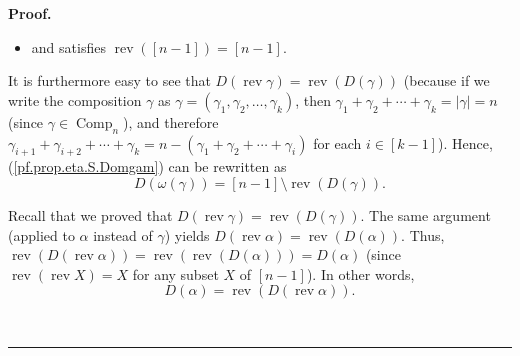 \documentclass[numbers=enddot,12pt,final,onecolumn,notitlepage]{scrartcl}%
\theoremstyle{definition}
\newenvironment{proof}[1][Proof]{\noindent\textbf{#1.} }{\ \rule{0.5em}{0.5em}}
\newenvironment{noncompile}{}{}
\begin{document}
\begin{proof}
\begin{noncompile}
\begin{itemize}
\item and satisfies $\operatorname*{rev}\left(  \left[  n-1\right]  \right)
=\left[  n-1\right]  $.
\end{itemize}

It is furthermore easy to see that $D\left(  \operatorname*{rev}\gamma\right)
=\operatorname*{rev}\left(  D\left(  \gamma\right)  \right)  $ (because if we
write the composition $\gamma$ as $\gamma=\left(  \gamma_{1},\gamma_{2}%
,\ldots,\gamma_{k}\right)  $, then $\gamma_{1}+\gamma_{2}+\cdots+\gamma
_{k}=\left\vert \gamma\right\vert =n$ (since $\gamma\in\operatorname*{Comp}%
\nolimits_{n}$), and therefore $\gamma_{i+1}+\gamma_{i+2}+\cdots+\gamma
_{k}=n-\left(  \gamma_{1}+\gamma_{2}+\cdots+\gamma_{i}\right)  $ for each
$i\in\left[  k-1\right]  $). Hence, (\ref{pf.prop.eta.S.Domgam}) can be
rewritten as%
\begin{equation}
D\left(  \omega\left(  \gamma\right)  \right)  =\left[  n-1\right]
\setminus\operatorname*{rev}\left(  D\left(  \gamma\right)  \right)  .
\label{pf.prop.eta.S.O1.Dwg}%
\end{equation}


Recall that we proved that $D\left(  \operatorname*{rev}\gamma\right)
=\operatorname*{rev}\left(  D\left(  \gamma\right)  \right)  $. The same
argument (applied to $\alpha$ instead of $\gamma$) yields $D\left(
\operatorname*{rev}\alpha\right)  =\operatorname*{rev}\left(  D\left(
\alpha\right)  \right)  $. Thus, $\operatorname*{rev}\left(  D\left(
\operatorname*{rev}\alpha\right)  \right)  =\operatorname*{rev}\left(
\operatorname*{rev}\left(  D\left(  \alpha\right)  \right)  \right)  =D\left(
\alpha\right)  $ (since $\operatorname*{rev}\left(  \operatorname*{rev}%
X\right)  =X$ for any subset $X$ of $\left[  n-1\right]  $). In other words,%
\begin{equation}
D\left(  \alpha\right)  =\operatorname*{rev}\left(  D\left(
\operatorname*{rev}\alpha\right)  \right)  . \label{pf.prop.eta.S.O1.rra}%
\end{equation}



\end{noncompile}
\end{proof}
\end{document}
